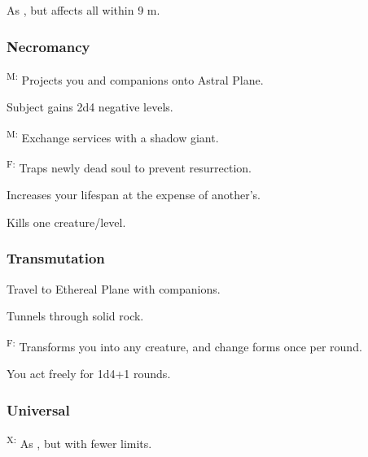 	 As , but affects all within 9 m.

\subsubsection{Necromancy}
	\textsuperscript{M:} Projects you and companions onto Astral Plane.

	 Subject gains 2d4 negative levels.

	\textsuperscript{M:} Exchange services with a shadow giant. %

	\textsuperscript{F:} Traps newly dead soul to prevent resurrection.

	 Increases your lifespan at the expense of another's. %

	 Kills one creature/level.

\subsubsection{Transmutation}
	 Travel to Ethereal Plane with companions.

	 Tunnels through solid rock. %

	\textsuperscript{F:} Transforms you into any creature, and change forms once per round.

	 You act freely for 1d4+1 rounds.

\subsubsection{Universal}
	\textsuperscript{X:} As , but with fewer limits.